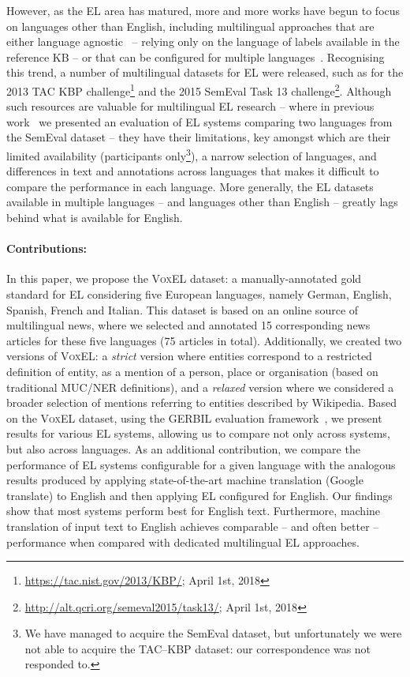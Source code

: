 \documentclass{llncs}
\begin{document}
However, as the EL area has matured, more and more works have begun to focus on languages other than English, including multilingual approaches that are either language agnostic~\cite{THD-dojchinovski2012recognizing,daiber2013improving,ferragina2010tagme,mag2017} -- relying only on the language of labels available in the reference KB -- or that can be configured for multiple languages~\cite{Babelfy-moro2014entity,freme-ner2016}. Recognising this trend, a number of multilingual datasets for EL were released, such as for the 2013 TAC KBP challenge\footnote{\url{https://tac.nist.gov/2013/KBP/}; April 1st, 2018} %
and the 2015 SemEval Task 13 challenge\footnote{\url{http://alt.qcri.org/semeval2015/task13/}; April 1st, 2018}. Although such resources are valuable for multilingual EL research -- where in previous work~\cite{Rosales-MendezP17} we presented an evaluation of EL systems comparing two languages from the SemEval dataset -- they have their limitations, key amongst which are their limited availability (participants only\footnote{We have managed to acquire the SemEval dataset, but unfortunately we were not able to acquire the TAC--KBP dataset: our correspondence was not responded to.}), a narrow selection of languages, and differences in text and annotations across languages that makes it difficult to compare the performance in each language. More generally, the EL datasets available in multiple languages -- and languages other than English -- greatly lags behind what is available for English.

\paragraph{Contributions:} In this paper, we propose the \textsc{VoxEL} dataset: a manually-annotated gold standard for EL considering five European languages, namely German, English, Spanish, French and Italian. This dataset is based on an online source of multilingual news, where we selected and annotated 15 corresponding news articles for these five languages (75 articles in total). Additionally, we created two versions of \textsc{VoxEL}: a \textit{strict} version where entities correspond to a restricted definition of entity, as a mention of a person, place or organisation (based on traditional MUC/NER definitions), and a \textit{relaxed} version where we considered a broader selection of mentions referring to entities described by Wikipedia. Based on the \textsc{VoxEL} dataset, using the GERBIL evaluation framework~\cite{gerbil-2015}, we present results for various EL systems, allowing us to compare not only across systems, but also across languages. As an additional contribution, we compare the performance of EL systems configurable for a given language with the analogous results produced by applying state-of-the-art machine translation (Google translate) to English and then applying EL configured for English. Our findings show that most systems perform best for English text. Furthermore, machine translation of input text to English achieves comparable -- and often better -- performance when compared with dedicated multilingual EL approaches. 
\end{document}
